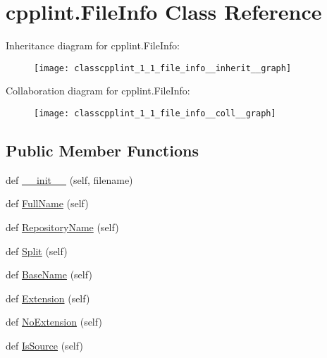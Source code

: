 \hypertarget{classcpplint_1_1_file_info}{}\section{cpplint.\+File\+Info Class Reference}
\label{classcpplint_1_1_file_info}


Inheritance diagram for cpplint.\+File\+Info\+:
\nopagebreak
\begin{figure}[H]
\begin{center}
\leavevmode
\texttt{[image: classcpplint\_1\_1\_file\_info\_\_inherit\_\_graph]}
\end{center}
\end{figure}


Collaboration diagram for cpplint.\+File\+Info\+:
\nopagebreak
\begin{figure}[H]
\begin{center}
\leavevmode
\texttt{[image: classcpplint\_1\_1\_file\_info\_\_coll\_\_graph]}
\end{center}
\end{figure}
\subsection*{Public Member Functions}
\begin{DoxyCompactItemize}
\item 
def \hyperlink{classcpplint_1_1_file_info_abd3ff77aab027af2476b3a1d97b1f89c}{\+\_\+\+\_\+init\+\_\+\+\_\+} (self, filename)
\item 
def \hyperlink{classcpplint_1_1_file_info_aed56577368c45cdf45fc4c9109129145}{Full\+Name} (self)
\item 
def \hyperlink{classcpplint_1_1_file_info_a2b3b79b7d46221a6b9d0ea0bebac2061}{Repository\+Name} (self)
\item 
def \hyperlink{classcpplint_1_1_file_info_a43f1c5ff1771da52e29c60c114955e72}{Split} (self)
\item 
def \hyperlink{classcpplint_1_1_file_info_a1a12ed63ddc2ffd8f6a105e3ab4d6289}{Base\+Name} (self)
\item 
def \hyperlink{classcpplint_1_1_file_info_a2554b504117839931e901b59a59c67ae}{Extension} (self)
\item 
def \hyperlink{classcpplint_1_1_file_info_acb46555a72b346966f4bf28c08e3b1fa}{No\+Extension} (self)
\item 
def \hyperlink{classcpplint_1_1_file_info_a157f8d3266d7291321db88cdad3b2879}{Is\+Source} (self)
\end{DoxyCompactItemize}


